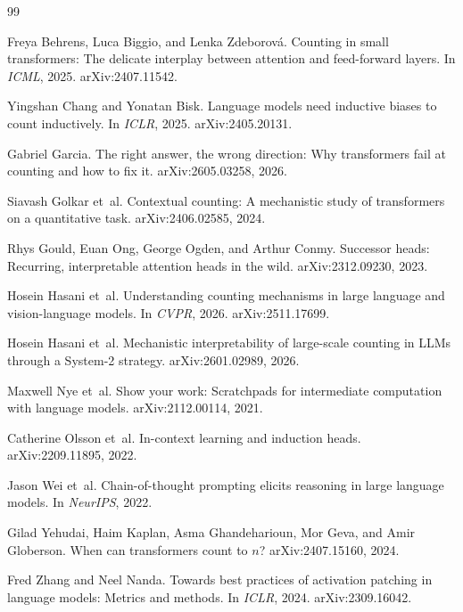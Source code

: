 \documentclass[10pt,twocolumn]{article}
\begin{document}
\begin{thebibliography}{99}

Freya Behrens, Luca Biggio, and Lenka Zdeborov\'a.
\newblock Counting in small transformers: The delicate interplay between attention and
feed-forward layers.
\newblock In \emph{ICML}, 2025. arXiv:2407.11542.

Yingshan Chang and Yonatan Bisk.
\newblock Language models need inductive biases to count inductively.
\newblock In \emph{ICLR}, 2025. arXiv:2405.20131.

Gabriel Garcia.
\newblock The right answer, the wrong direction: Why transformers fail at counting and how to fix it.
\newblock arXiv:2605.03258, 2026.

Siavash Golkar et~al.
\newblock Contextual counting: A mechanistic study of transformers on a quantitative task.
\newblock arXiv:2406.02585, 2024.

Rhys Gould, Euan Ong, George Ogden, and Arthur Conmy.
\newblock Successor heads: Recurring, interpretable attention heads in the wild.
\newblock arXiv:2312.09230, 2023.

Hosein Hasani et~al.
\newblock Understanding counting mechanisms in large language and vision-language models.
\newblock In \emph{CVPR}, 2026. arXiv:2511.17699.

Hosein Hasani et~al.
\newblock Mechanistic interpretability of large-scale counting in LLMs through a System-2 strategy.
\newblock arXiv:2601.02989, 2026.

Maxwell Nye et~al.
\newblock Show your work: Scratchpads for intermediate computation with language models.
\newblock arXiv:2112.00114, 2021.

Catherine Olsson et~al.
\newblock In-context learning and induction heads.
\newblock arXiv:2209.11895, 2022.

Jason Wei et~al.
\newblock Chain-of-thought prompting elicits reasoning in large language models.
\newblock In \emph{NeurIPS}, 2022.

Gilad Yehudai, Haim Kaplan, Asma Ghandeharioun, Mor Geva, and Amir Globerson.
\newblock When can transformers count to $n$?
\newblock arXiv:2407.15160, 2024.

Fred Zhang and Neel Nanda.
\newblock Towards best practices of activation patching in language models: Metrics and methods.
\newblock In \emph{ICLR}, 2024. arXiv:2309.16042.

\end{thebibliography}
\end{document}
